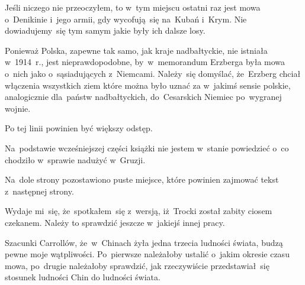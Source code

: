 \documentclass[a4paper,11pt]{article}
\begin{document}
\VerSpaceFour





\noindent
{} Jeśli niczego nie przeoczyłem, to w~tym miejscu ostatni raz jest
mowa o~Denikinie i~jego armii, gdy wycofują~się na~Kubań i~Krym. Nie
dowiadujemy~się tym samym jakie były ich dalsze losy.

\VerSpaceFour





\noindent
{} Ponieważ Polska, zapewne tak samo, jak kraje nadbałtyckie, nie
istniała w~1914~r., jest nieprawdopodobne, by~w~memorandum Erzberga była
mowa o~nich jako o~sąsiadujących z~Niemcami. Należy~się domyślać,
że~Erzberg chciał włączenia wszystkich ziem które można było uznać za
w~jakimś sensie polskie, analogicznie dla~państw nadbałtyckich,
do~Cesarskich Niemiec po~wygranej wojnie.

\VerSpaceFour





\noindent
{} Po tej linii powinien być większy odstęp.

\VerSpaceFour





\noindent
{} Na~podstawie wcześniejszej części książki nie jestem
w~stanie powiedzieć o~co chodziło w~sprawie nadużyć w~Gruzji.

\VerSpaceFour





\noindent
{} Na~dole strony pozostawiono puste miejsce, które powinien
zajmować tekst z~następnej strony.

\VerSpaceFour





\noindent
{} Wydaje mi~się, że~spotkałem~się z~wersją, iż~Trocki
został zabity ciosem czekanem. Należy to sprawdzić jeszcze w~jakiejś innej
pracy.

\VerSpaceFour





\noindent
{} Szacunki Carrollów, że~w~Chinach żyła jedna trzecia
ludności świata, budzą pewne moje wątpliwości. Po~pierwsze należałoby
ustalić o~jakim okresie czasu mowa, po~drugie należałoby sprawdzić, jak
rzeczywiście przedstawiał~się stosunek ludności Chin do ludności świata.
\end{document}
